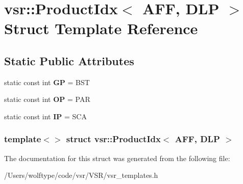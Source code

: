 \hypertarget{structvsr_1_1_product_idx_3_01_a_f_f_00_01_d_l_p_01_4}{\section{vsr\-:\-:Product\-Idx$<$ A\-F\-F, D\-L\-P $>$ Struct Template Reference}
\label{structvsr_1_1_product_idx_3_01_a_f_f_00_01_d_l_p_01_4}
}
\subsection*{Static Public Attributes}
\begin{DoxyCompactItemize}
\item 
\hypertarget{structvsr_1_1_product_idx_3_01_a_f_f_00_01_d_l_p_01_4_ac480c046712c274709cd9d84887ce8f6}{static const int {\bfseries G\-P} = B\-S\-T}\label{structvsr_1_1_product_idx_3_01_a_f_f_00_01_d_l_p_01_4_ac480c046712c274709cd9d84887ce8f6}

\item 
\hypertarget{structvsr_1_1_product_idx_3_01_a_f_f_00_01_d_l_p_01_4_a0dda6d729e9c3495c023f12a11d643f1}{static const int {\bfseries O\-P} = P\-A\-R}\label{structvsr_1_1_product_idx_3_01_a_f_f_00_01_d_l_p_01_4_a0dda6d729e9c3495c023f12a11d643f1}

\item 
\hypertarget{structvsr_1_1_product_idx_3_01_a_f_f_00_01_d_l_p_01_4_a892af6b58894372070f35fec5915c07c}{static const int {\bfseries I\-P} = S\-C\-A}\label{structvsr_1_1_product_idx_3_01_a_f_f_00_01_d_l_p_01_4_a892af6b58894372070f35fec5915c07c}

\end{DoxyCompactItemize}
\subsubsection*{template$<$$>$ struct vsr\-::\-Product\-Idx$<$ A\-F\-F, D\-L\-P $>$}



The documentation for this struct was generated from the following file\-:\begin{DoxyCompactItemize}
\item 
/\-Users/wolftype/code/vsr/\-V\-S\-R/vsr\-\_\-templates.\-h\end{DoxyCompactItemize}
